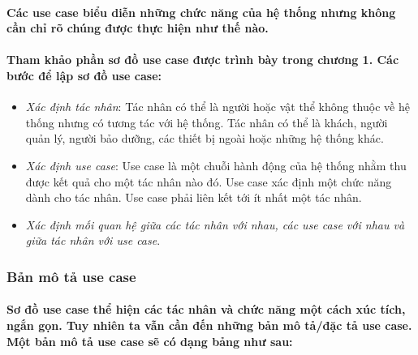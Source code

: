 \documentclass{article}
\begin{document}
      \paragraph{\textnormal{
        Các use case biểu diễn những chức năng của hệ thống nhưng không cần chỉ rõ chúng được thực hiện như thế nào.
      }}
      \paragraph{\textnormal{
        Tham khảo phần sơ đồ use case được trình bày trong chương 1. Các bước để lập sơ đồ use case:
      }}
      \begin{itemize}
        \item \textit{Xác định tác nhân}: Tác nhân có thể là người hoặc vật thể không thuộc về hệ thống nhưng có tương tác với hệ thống. Tác nhân có thể là khách, người quản lý, người bảo dưỡng, các thiết bị ngoài hoặc những hệ thống khác.
        \item \textit{Xác định use case}: Use case là một chuỗi hành động của hệ thống nhằm thu được kết quả cho một tác nhân nào đó. Use case xác định một chức năng dành cho tác nhân. Use case phải liên kết tới ít nhất một tác nhân.
        \item \textit{Xác định mối quan hệ giữa các tác nhân với nhau, các use case với nhau và giữa tác nhân với use case}.
      \end{itemize}
    
    \subsubsection{Bản mô tả use case}
      \paragraph{\textnormal{
        Sơ đồ use case thể hiện các tác nhân và chức năng một cách xúc tích, ngắn gọn. Tuy nhiên ta vẫn cần đến những bản mô tả/đặc tả use case. Một bản mô tả use case sẽ có dạng bảng như sau:
      }}
\end{document}
